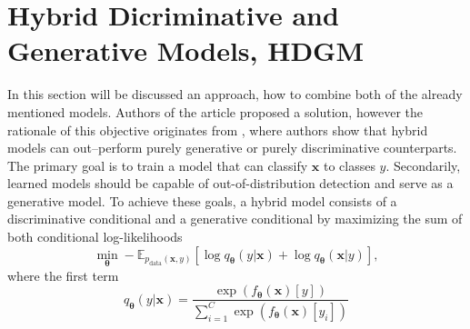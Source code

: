 \section{Hybrid Dicriminative and Generative Models, HDGM}
In this section will be discussed an approach, how to combine both of the already mentioned models.
Authors of the article \cite{HDGEmain} proposed a solution, however the rationale of this objective originates from \cite{generativevsdisriminative}, where authors show that hybrid models can out--perform purely generative or purely discriminative counterparts.\\
The primary goal is to train a model that can classify $\boldsymbol{x}$ to classes $y$. Secondarily, learned models should be capable of out-of-distribution detection and serve as a generative model. To achieve these goals, a hybrid model consists of a discriminative conditional and a generative conditional by maximizing the sum of both conditional log-likelihoods
\begin{equation}\label{q1q2}
	\min_{\boldsymbol{\theta}}- \mathbb{E}_{p_{\mathrm{data}}(\boldsymbol{x},y)}\left[\log q_{\boldsymbol{\theta}}\left(y|\boldsymbol{x}\right)+ \log q_{\boldsymbol{\theta}}\left(\boldsymbol{x}|y\right) \right],
\end{equation}
where the first term 
\begin{equation}
q_{\boldsymbol{\theta}}\left(y|\boldsymbol{x}\right) = \frac{\exp\left({f_{\boldsymbol{\theta}}\left(\boldsymbol{x}\right)[y]}\right)}{\sum_{i=1}^C\exp\left({f_{\boldsymbol{\theta}}\left(\boldsymbol{x}\right)[y_i]}\right)}
\end{equation}

